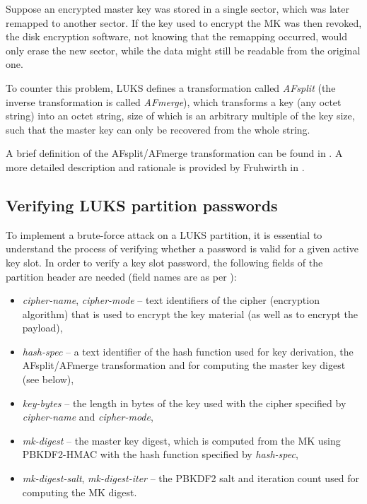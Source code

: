 \documentclass[12pt,oneside]{fithesis2}
\begin{document}
      Suppose an encrypted master key was stored in a single sector, which was later remapped to another sector. If the key used to encrypt the MK was then revoked, the disk encryption software, not knowing that the remapping occurred, would only erase the new sector, while the data might still be readable from the original one.
      
      To counter this problem, LUKS defines a transformation called \emph{AFsplit} (the inverse transformation is called \emph{AFmerge}), which transforms a key (any octet string) into an octet string, size of which is an arbitrary multiple of the key size, such that the master key can only be recovered from the whole string.
      
      A brief definition of the AFsplit/AFmerge transformation can be found in \cite[section 2.4]{luks}. A more detailed description and rationale is provided by Fruhwirth in \cite[section 5.2]{Fruhwirth}.
      
      \subsection{Verifying LUKS partition passwords}
      To implement a brute-force attack on a LUKS partition, it is essential to understand the process of verifying whether a password is valid for a given active key slot. In order to verify a key slot password, the following fields of the partition header are needed (field names are as per \cite{luks}):
      \begin{itemize}
        \item \emph{cipher-name}, \emph{cipher-mode} -- text identifiers of the cipher (encryption algorithm) that is used to encrypt the key material (as well as to encrypt the payload),
        \item \emph{hash-spec} -- a text identifier of the hash function used for key derivation, the AFsplit/AFmerge transformation and for computing the master key digest (see below),
        \item \emph{key-bytes} -- the length in bytes of the key used with the cipher specified by \emph{cipher-name} and \emph{cipher-mode},
        \item \emph{mk-digest} -- the master key digest, which is computed from the MK using PBKDF2-HMAC with the hash function specified by \emph{hash-spec},
        \item \emph{mk-digest-salt}, \emph{mk-digest-iter} -- the PBKDF2 salt and iteration count used for computing the MK digest.
      \end{itemize}
      
\end{document}
